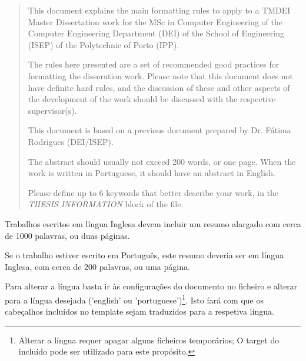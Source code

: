 \begin{abstract}


	This document explains the main formatting rules to apply to a TMDEI Master Dissertation work for the MSc in Computer Engineering of the Computer Engineering Department (DEI) of the School of Engineering (ISEP) of the Polytechnic of Porto (IPP).

	The rules here presented are a set of recommended good practices for formatting the disseration work. Please note that this document does not have definite hard rules, and the discussion of these and other aspects of the development of the work should be discussed with the respective supervisor(s).

	This document is based on a previous document prepared by Dr. Fátima Rodrigues (DEI/ISEP).

	The abstract should usually not exceed 200 words, or one page. When the work is written in Portuguese, it should have an abstract in English.

	Please define up to 6 keywords that better describe your work, in the \emph{THESIS INFORMATION} block of the  file.

\end{abstract}

\begin{abstractotherlanguage}

	Trabalhos escritos em língua Inglesa devem incluir um resumo alargado com cerca de 1000 palavras, ou duas páginas.

	Se o trabalho estiver escrito em Português, este resumo deveria ser em língua Inglesa, com cerca de 200 palavras, ou uma página.

	Para alterar a língua basta ir às configurações do documento no ficheiro  e alterar para a língua desejada ('english' ou 'portuguese')\footnote{Alterar a língua requer apagar alguns ficheiros temporários; O target  do  incluído pode ser utilizado para este propósito.}. Isto fará com que os cabeçalhos incluídos no template sejam traduzidos para a respetiva língua.

\end{abstractotherlanguage}


